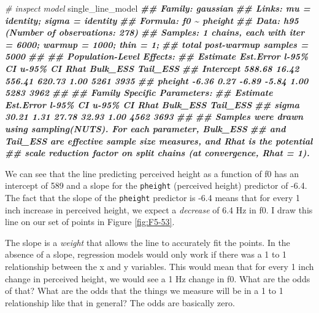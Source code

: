 \documentclass[
]{book}
\newenvironment{Shaded}{\begin{snugshade}}{\end{snugshade}}
\newcommand{\CommentTok}[1]{\textcolor[rgb]{0.56,0.35,0.01}{\textit{#1}}}
\newcommand{\DocumentationTok}[1]{\textcolor[rgb]{0.56,0.35,0.01}{\textbf{\textit{#1}}}}
\newcommand{\NormalTok}[1]{#1}
\begin{document}
\begin{Shaded}
\begin{Highlighting}[]
\CommentTok{\# inspect model}
\NormalTok{single\_line\_model}
\DocumentationTok{\#\#  Family: gaussian }
\DocumentationTok{\#\#   Links: mu = identity; sigma = identity }
\DocumentationTok{\#\# Formula: f0 \textasciitilde{} pheight }
\DocumentationTok{\#\#    Data: h95 (Number of observations: 278) }
\DocumentationTok{\#\# Samples: 1 chains, each with iter = 6000; warmup = 1000; thin = 1;}
\DocumentationTok{\#\#          total post{-}warmup samples = 5000}
\DocumentationTok{\#\# }
\DocumentationTok{\#\# Population{-}Level Effects: }
\DocumentationTok{\#\#           Estimate Est.Error l{-}95\% CI u{-}95\% CI Rhat Bulk\_ESS Tail\_ESS}
\DocumentationTok{\#\# Intercept   588.68     16.42   556.41   620.73 1.00     5261     3935}
\DocumentationTok{\#\# pheight      {-}6.36      0.27    {-}6.89    {-}5.84 1.00     5283     3962}
\DocumentationTok{\#\# }
\DocumentationTok{\#\# Family Specific Parameters: }
\DocumentationTok{\#\#       Estimate Est.Error l{-}95\% CI u{-}95\% CI Rhat Bulk\_ESS Tail\_ESS}
\DocumentationTok{\#\# sigma    30.21      1.31    27.78    32.93 1.00     4562     3693}
\DocumentationTok{\#\# }
\DocumentationTok{\#\# Samples were drawn using sampling(NUTS). For each parameter, Bulk\_ESS}
\DocumentationTok{\#\# and Tail\_ESS are effective sample size measures, and Rhat is the potential}
\DocumentationTok{\#\# scale reduction factor on split chains (at convergence, Rhat = 1).}
\end{Highlighting}
\end{Shaded}

We can see that the line predicting perceived height as a function of f0 has an intercept of 589 and a slope for the \texttt{pheight} (perceived height) predictor of -6.4. The fact that the slope of the \texttt{pheight} predictor is -6.4 means that for every 1 inch increase in perceived height, we expect a \emph{decrease} of 6.4 Hz in f0. I draw this line on our set of points in Figure \ref{fig:F5-53}.

The slope is a \emph{weight} that allows the line to accurately fit the points. In the absence of a slope, regression models would only work if there was a 1 to 1 relationship between the x and y variables. This would mean that for every 1 inch change in perceived height, we would see a 1 Hz change in f0. What are the odds of that? What are the odds that the things we measure will be in a 1 to 1 relationship like that in general? The odds are basically zero.
\end{document}
